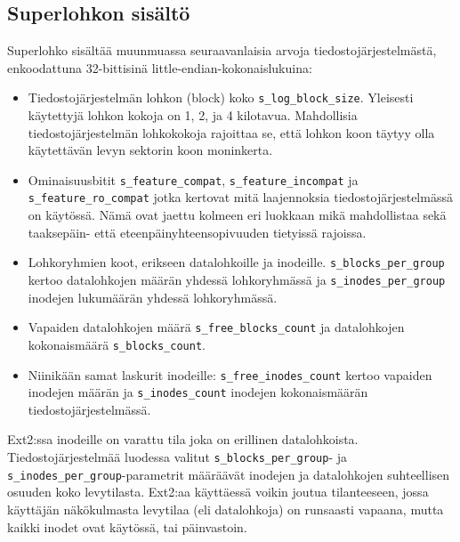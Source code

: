 \subsection{Superlohkon sisältö}
Superlohko sisältää muunmuassa seuraavanlaisia arvoja tiedostojärjestelmästä, enkoodattuna 32-bittisinä little-endian-kokonaislukuina:
\begin{itemize}
    \item Tiedostojärjestelmän lohkon (block) koko \texttt{s\_log\_block\_size}. Yleisesti käytettyjä lohkon kokoja on 1, 2, ja 4 kilotavua.
          Mahdollisia tiedostojärjestelmän lohkokokoja rajoittaa se, että lohkon koon täytyy olla käytettävän levyn sektorin koon moninkerta.
    \item Ominaisuusbitit \texttt{s\_feature\_compat}, \texttt{s\_feature\_incompat} ja \texttt{s\_feature\_ro\_compat} jotka kertovat mitä laajennoksia tiedostojärjestelmässä on käytössä.
          Nämä ovat jaettu kolmeen eri luokkaan mikä mahdollistaa sekä taaksepäin- että eteenpäinyhteensopivuuden tietyissä rajoissa.
    \item Lohkoryhmien koot, erikseen datalohkoille ja inodeille.
          \texttt{s\_blocks\_per\_group} kertoo datalohkojen määrän yhdessä lohkoryhmässä ja \texttt{s\_inodes\_per\_group} inodejen lukumäärän yhdessä lohkoryhmässä.
    \item Vapaiden datalohkojen määrä \texttt{s\_free\_blocks\_count} ja datalohkojen kokonaismäärä \texttt{s\_blocks\_count}.
    \item Niinikään samat laskurit inodeille: \texttt{s\_free\_inodes\_count} kertoo vapaiden inodejen määrän ja \texttt{s\_inodes\_count} inodejen kokonaismäärän tiedostojärjestelmässä.
\end{itemize}

Ext2:ssa inodeille on varattu tila joka on erillinen datalohkoista.
Tiedostojärjestelmää luodessa valitut \texttt{s\_blocks\_per\_group}- ja \texttt{s\_inodes\_per\_group}-parametrit määräävät inodejen ja datalohkojen suhteellisen osuuden koko levytilasta.
Ext2:aa käyttäessä voikin joutua tilanteeseen, jossa käyttäjän näkökulmasta levytilaa (eli datalohkoja) on runsaasti vapaana, mutta kaikki inodet ovat käytössä, tai päinvastoin.

